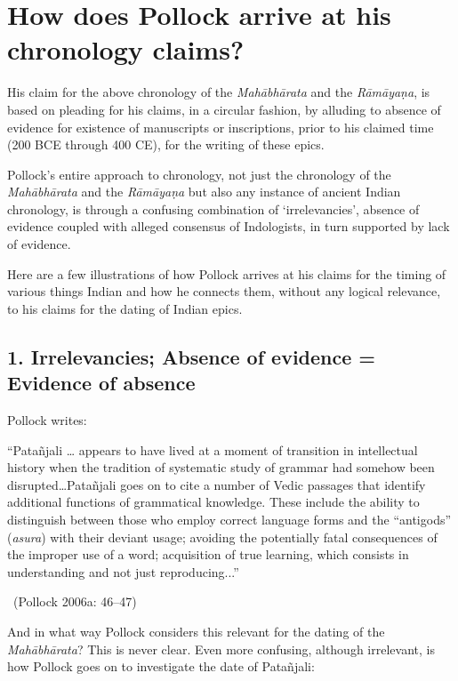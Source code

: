 \section*{How does Pollock arrive at his chronology claims?}

His claim for the above chronology of the \textit{Mahābhārata} and the \textit{Rāmāyaṇa}, is based on pleading for his claims, in a circular fashion, by alluding to absence of evidence for existence of manuscripts or inscriptions, prior to his claimed time (200 BCE through 400 CE), for the writing of these epics.

Pollock’s entire approach to chronology, not just the chronology of the \textit{Mahābhārata} and the \textit{Rāmāyaṇa} but also any instance of ancient Indian chronology, is through a confusing combination of ‘irrelevancies’, absence of evidence coupled with alleged consensus of Indologists, in turn supported by lack of evidence.

Here are a few illustrations of how Pollock arrives at his claims for the timing of various things Indian and how he connects them, without any logical relevance, to his claims for the dating of Indian epics.

\subsection*{1. Irrelevancies; Absence of evidence = Evidence of absence}

Pollock writes:

\begin{myquote}
“Patañjali … appears to have lived at a moment of transition in intellectual history when the tradition of systematic study of grammar had somehow been disrupted…Patañjali goes on to cite a number of Vedic passages that identify additional functions of grammatical knowledge. These include the ability to distinguish between those who employ correct language forms and the “antigods” (\textit{asura}) with their deviant usage; avoiding the potentially fatal consequences of the improper use of a word; acquisition of true learning, which consists in understanding and not just reproducing...” 

~\hfill (Pollock 2006a: 46–47)
\end{myquote}

And in what way Pollock considers this relevant for the dating of the \textit{Mahābhārata}? This is never clear. Even more confusing, although irrelevant, is how Pollock goes on to investigate the date of Patañjali:

